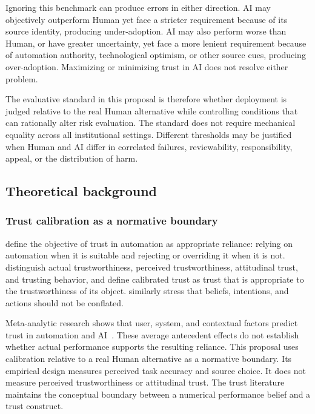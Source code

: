 \documentclass[11pt,a4paper]{article}
\begin{document}
Ignoring this benchmark can produce errors in either direction. AI may objectively outperform Human yet face a stricter requirement because of its source identity, producing under-adoption. AI may also perform worse than Human, or have greater uncertainty, yet face a more lenient requirement because of automation authority, technological optimism, or other source cues, producing over-adoption. Maximizing or minimizing trust in AI does not resolve either problem.

The evaluative standard in this proposal is therefore whether deployment is judged relative to the real Human alternative while controlling conditions that can rationally alter risk evaluation. The standard does not require mechanical equality across all institutional settings. Different thresholds may be justified when Human and AI differ in correlated failures, reviewability, responsibility, appeal, or the distribution of harm.

\subsection{Theoretical background}

\subsubsection{Trust calibration as a normative boundary}

\citet{lee2004} define the objective of trust in automation as appropriate reliance: relying on automation when it is suitable and rejecting or overriding it when it is not. \citet{everett2026} distinguish actual trustworthiness, perceived trustworthiness, attitudinal trust, and trusting behavior, and define calibrated trust as trust that is appropriate to the trustworthiness of its object. \citet{mehrotra2024} similarly stress that beliefs, intentions, and actions should not be conflated.

Meta-analytic research shows that user, system, and contextual factors predict trust in automation and AI~\citep{kaplan2023,schaefer2016}. These average antecedent effects do not establish whether actual performance supports the resulting reliance. This proposal uses calibration relative to a real Human alternative as a normative boundary. Its empirical design measures perceived task accuracy and source choice. It does not measure perceived trustworthiness or attitudinal trust. The trust literature maintains the conceptual boundary between a numerical performance belief and a trust construct.
\end{document}
